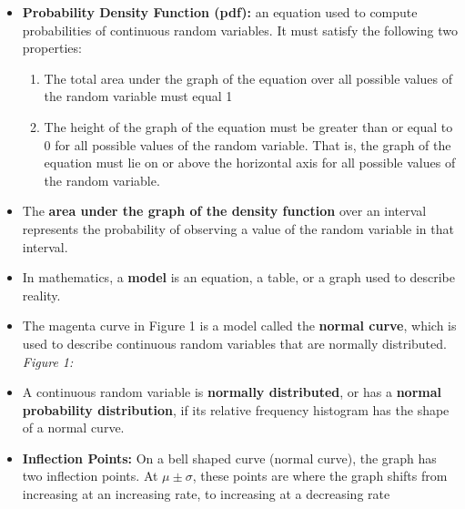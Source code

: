 \documentclass{report}
\begin{document}
      \begin{itemize}
          \item \textbf{Probability Density Function (pdf):} an equation used to compute probabilities of continuous random variables. It must satisfy the following two properties:
              \begin{enumerate}
                  \item The total area under the graph of the equation over all possible values of the random variable must equal 1
                \item The height of the graph of the equation must be greater than or equal to 0 for all possible values of the random variable. That is, the graph of the equation must lie on or above the horizontal axis for all possible values of the random variable.
              \end{enumerate}
          \item The \textbf{area under the graph of the density function} over an interval represents the probability of observing a value of the random variable in that interval.
          \item In mathematics, a \textbf{model} is an equation, a table, or a graph used to describe reality. 
          \item The magenta curve in Figure 1 is a model called the \textbf{normal curve}, which is used to describe continuous random variables that are normally distributed.
                \bigbreak \noindent 
                \textit{Figure 1:}
                \bigbreak \noindent 
            \item A continuous random variable is \textbf{normally distributed}, or has a \textbf{normal probability distribution}, if its relative frequency histogram has the shape of a normal curve.
            \item \textbf{Inflection Points:} On a bell shaped curve (normal curve), the graph has two inflection points. At $\mu \pm \sigma$, these points are where the graph shifts from increasing at an increasing rate, to increasing at a decreasing rate
      \end{itemize}
\end{document}
